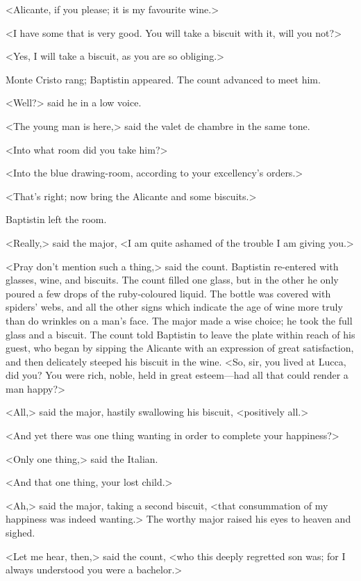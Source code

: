  <Alicante, if you please; it is my favourite wine.> 

 <I have some that is very good. You will take a biscuit with it, will you not?> 

 <Yes, I will take a biscuit, as you are so obliging.> 

 Monte Cristo rang; Baptistin appeared. The count advanced to meet him. 

 <Well?> said he in a low voice. 

 <The young man is here,> said the valet de chambre in the same tone. 

 <Into what room did you take him?> 

 <Into the blue drawing-room, according to your excellency's orders.> 

 <That's right; now bring the Alicante and some biscuits.> 

 Baptistin left the room. 

 <Really,> said the major, <I am quite ashamed of the trouble I am giving you.> 

 <Pray don't mention such a thing,> said the count. Baptistin re-entered with glasses, wine, and biscuits. The count filled one glass, but in the other he only poured a few drops of the ruby-coloured liquid. The bottle was covered with spiders' webs, and all the other signs which indicate the age of wine more truly than do wrinkles on a man's face. The major made a wise choice; he took the full glass and a biscuit. The count told Baptistin to leave the plate within reach of his guest, who began by sipping the Alicante with an expression of great satisfaction, and then delicately steeped his biscuit in the wine.  <So, sir, you lived at Lucca, did you? You were rich, noble, held in great esteem—had all that could render a man happy?> 

 <All,> said the major, hastily swallowing his biscuit, <positively all.> 

 <And yet there was one thing wanting in order to complete your happiness?> 

 <Only one thing,> said the Italian. 

 <And that one thing, your lost child.> 

 <Ah,> said the major, taking a second biscuit, <that consummation of my happiness was indeed wanting.> The worthy major raised his eyes to heaven and sighed. 

 <Let me hear, then,> said the count, <who this deeply regretted son was; for I always understood you were a bachelor.> 

